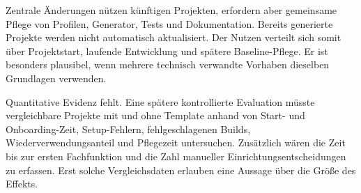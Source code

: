 Zentrale Änderungen nützen künftigen Projekten, erfordern aber gemeinsame
Pflege von Profilen, Generator, Tests und Dokumentation. Bereits generierte
Projekte werden nicht automatisch aktualisiert.
Der Nutzen verteilt sich somit über Projektstart, laufende Entwicklung und
spätere Baseline-Pflege. Er ist besonders plausibel, wenn mehrere technisch
verwandte Vorhaben dieselben Grundlagen verwenden.

Quantitative Evidenz fehlt. Eine spätere kontrollierte Evaluation müsste
vergleichbare Projekte mit und ohne Template anhand von Start- und
Onboarding-Zeit, Setup-Fehlern, fehlgeschlagenen Builds, Wiederverwendungsanteil
und Pflegezeit untersuchen.
Zusätzlich wären die Zeit bis zur ersten Fachfunktion und die Zahl manueller
Einrichtungsentscheidungen zu erfassen. Erst solche Vergleichsdaten erlauben
eine Aussage über die Größe des Effekts.
